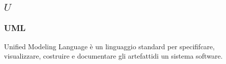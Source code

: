 \subsection*{\quad$U\quad$}
\subsubsection*{UML}
Unified Modeling Language è un linguaggio standard per specififcare, visualizzare, costruire e documentare gli artefatti\glosp di un sistema software.

